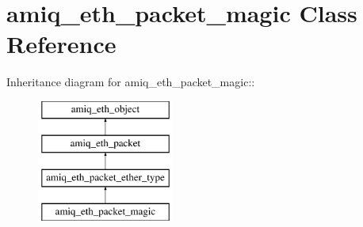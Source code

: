 \hypertarget{classamiq__eth__packet__magic}{
\section{amiq\_\-eth\_\-packet\_\-magic Class Reference}
\label{classamiq__eth__packet__magic}
}
Inheritance diagram for amiq\_\-eth\_\-packet\_\-magic::\begin{figure}[H]
\begin{center}
\leavevmode
\includegraphics[height=4cm]{classamiq__eth__packet__magic}
\end{center}
\end{figure}
